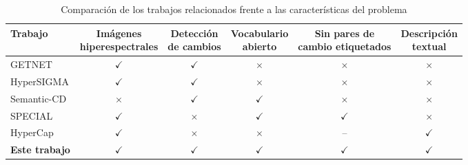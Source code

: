 \begin{table}[htbp]
\caption{Comparación de los trabajos relacionados frente a las características del problema}
\label{tab:vacio}
\centering
\begin{singlespace}
\footnotesize
\begin{tabular}{lccccc}
\toprule
\textbf{Trabajo} & \makecell{\textbf{Imágenes}\\\textbf{hiperespectrales}} & \makecell{\textbf{Detección}\\\textbf{de cambios}} & \makecell{\textbf{Vocabulario}\\\textbf{abierto}} & \makecell{\textbf{Sin pares de}\\\textbf{cambio etiquetados}} & \makecell{\textbf{Descripción}\\\textbf{textual}} \\
\midrule
GETNET \parencite{wang2019getnet} & $\checkmark$ & $\checkmark$ & $\times$ & $\times$ & $\times$ \\
HyperSIGMA \parencite{wang2024hypersigma} & $\checkmark$ & $\checkmark$ & $\times$ & $\times$ & $\times$ \\
Semantic-CD \parencite{zhu2025semanticcd} & $\times$ & $\checkmark$ & $\checkmark$ & $\times$ & $\times$ \\
SPECIAL \parencite{pang2025special} & $\checkmark$ & $\times$ & $\checkmark$ & $\checkmark$ & $\times$ \\
HyperCap \parencite{das2025hypercap} & $\checkmark$ & $\times$ & $\times$ & -- & $\checkmark$ \\
\midrule
\textbf{Este trabajo} & $\checkmark$ & $\checkmark$ & $\checkmark$ & $\checkmark$ & $\checkmark$ \\
\bottomrule
\end{tabular}
\end{singlespace}
\end{table}
